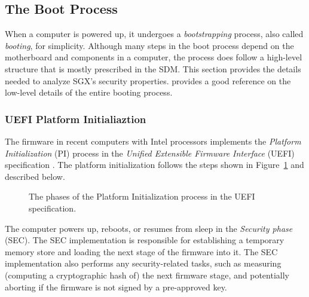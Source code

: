 \subsection{The Boot Process}
\label{sec:booting}

When a computer is powered up, it undergoes a \textit{bootstrapping} process,
also called \textit{booting}, for simplicity. Although many steps in the boot
process depend on the motherboard and components in a computer, the process
does follow a high-level structure that is mostly prescribed in the SDM. This
section provides the details needed to analyze SGX's security properties.
\cite{intel2010booting} provides a good reference on the low-level details of
the entire booting process.

\subsubsection{UEFI Platform Initialiaztion}
\label{sec:efi}

The firmware in recent computers with Intel processors implements the
\textit{Platform Initialization} (PI) process in the \textit{Unified
Extensible Firmware Interface} (UEFI) specification \cite{forum2015uefi}. The
platform initialization follows the steps shown in Figure~\ref{fig:uefi} and
described below.

\begin{figure}[hbt]
  \caption{
    The phases of the Platform Initialization process in the UEFI
    specification.
  }
  \label{fig:uefi}
\end{figure}

The computer powers up, reboots, or resumes from sleep in the
\textit{Security phase} (SEC). The SEC implementation is responsible for
establishing a temporary memory store and loading the next stage of the
firmware into it. The SEC implementation also performs any security-related
tasks, such as measuring (computing a cryptographic hash of) the next firmware
stage, and potentially aborting if the firmware is not signed by a pre-approved
key.


